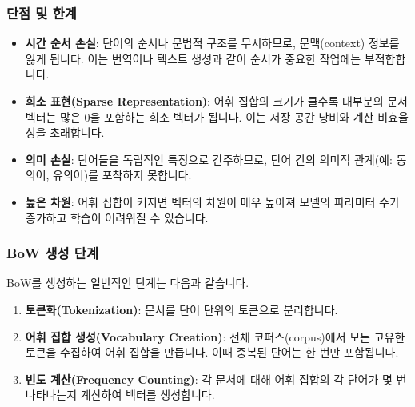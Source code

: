 \documentclass[11pt,a4paper]{article}
\theoremstyle{definition}
\begin{document}
\subsubsection{단점 및 한계}
\begin{itemize}
    \item \textbf{시간 순서 손실}: 단어의 순서나 문법적 구조를 무시하므로, 문맥(context) 정보를 잃게 됩니다. 이는 번역이나 텍스트 생성과 같이 순서가 중요한 작업에는 부적합합니다.
    \item \textbf{희소 표현(Sparse Representation)}: 어휘 집합의 크기가 클수록 대부분의 문서 벡터는 많은 0을 포함하는 희소 벡터가 됩니다. 이는 저장 공간 낭비와 계산 비효율성을 초래합니다.
    \item \textbf{의미 손실}: 단어들을 독립적인 특징으로 간주하므로, 단어 간의 의미적 관계(예: 동의어, 유의어)를 포착하지 못합니다.
    \item \textbf{높은 차원}: 어휘 집합이 커지면 벡터의 차원이 매우 높아져 모델의 파라미터 수가 증가하고 학습이 어려워질 수 있습니다.
\end{itemize}

\subsubsection{BoW 생성 단계}
BoW를 생성하는 일반적인 단계는 다음과 같습니다.
\begin{enumerate}
    \item \textbf{토큰화(Tokenization)}: 문서를 단어 단위의 토큰으로 분리합니다.
    \item \textbf{어휘 집합 생성(Vocabulary Creation)}: 전체 코퍼스(corpus)에서 모든 고유한 토큰을 수집하여 어휘 집합을 만듭니다. 이때 중복된 단어는 한 번만 포함됩니다.
    \item \textbf{빈도 계산(Frequency Counting)}: 각 문서에 대해 어휘 집합의 각 단어가 몇 번 나타나는지 계산하여 벡터를 생성합니다.
\end{enumerate}
\end{document}
